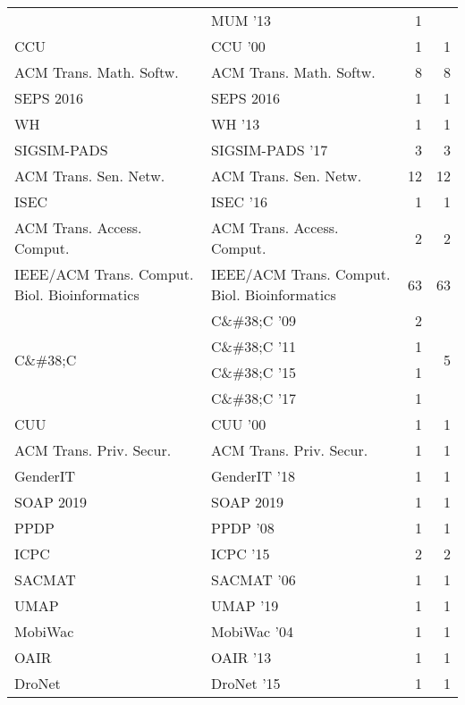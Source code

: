 \begin{table*}[t]
\begin{tabular}{llrr}
& MUM '13 & 1 &\\
\multirow{1}{*}{CCU } & CCU '00 & 1 & \multirow{1}{*}{1}\\
\multirow{1}{*}{ACM Trans. Math. Softw.} & ACM Trans. Math. Softw. & 8 & \multirow{1}{*}{8}\\
\multirow{1}{*}{SEPS 2016} & SEPS 2016 & 1 & \multirow{1}{*}{1}\\
\multirow{1}{*}{WH } & WH '13 & 1 & \multirow{1}{*}{1}\\
\multirow{1}{*}{SIGSIM-PADS } & SIGSIM-PADS '17 & 3 & \multirow{1}{*}{3}\\
\multirow{1}{*}{ACM Trans. Sen. Netw.} & ACM Trans. Sen. Netw. & 12 & \multirow{1}{*}{12}\\
\multirow{1}{*}{ISEC } & ISEC '16 & 1 & \multirow{1}{*}{1}\\
\multirow{1}{*}{ACM Trans. Access. Comput.} & ACM Trans. Access. Comput. & 2 & \multirow{1}{*}{2}\\
\multirow{1}{*}{IEEE/ACM Trans. Comput. Biol. Bioinformatics} & IEEE/ACM Trans. Comput. Biol. Bioinformatics & 63 & \multirow{1}{*}{63}\\
\multirow{4}{*}{C\&\#38;C } & C\&\#38;C '09 & 2 & \multirow{4}{*}{5}\\
& C\&\#38;C '11 & 1 &\\
& C\&\#38;C '15 & 1 &\\
& C\&\#38;C '17 & 1 &\\
\multirow{1}{*}{CUU } & CUU '00 & 1 & \multirow{1}{*}{1}\\
\multirow{1}{*}{ACM Trans. Priv. Secur.} & ACM Trans. Priv. Secur. & 1 & \multirow{1}{*}{1}\\
\multirow{1}{*}{GenderIT } & GenderIT '18 & 1 & \multirow{1}{*}{1}\\
\multirow{1}{*}{SOAP 2019} & SOAP 2019 & 1 & \multirow{1}{*}{1}\\
\multirow{1}{*}{PPDP } & PPDP '08 & 1 & \multirow{1}{*}{1}\\
\multirow{1}{*}{ICPC } & ICPC '15 & 2 & \multirow{1}{*}{2}\\
\multirow{1}{*}{SACMAT } & SACMAT '06 & 1 & \multirow{1}{*}{1}\\
\multirow{1}{*}{UMAP } & UMAP '19 & 1 & \multirow{1}{*}{1}\\
\multirow{1}{*}{MobiWac } & MobiWac '04 & 1 & \multirow{1}{*}{1}\\
\multirow{1}{*}{OAIR } & OAIR '13 & 1 & \multirow{1}{*}{1}\\
\multirow{1}{*}{DroNet } & DroNet '15 & 1 & \multirow{1}{*}{1}\\

\end{tabular}
\end{table*}
